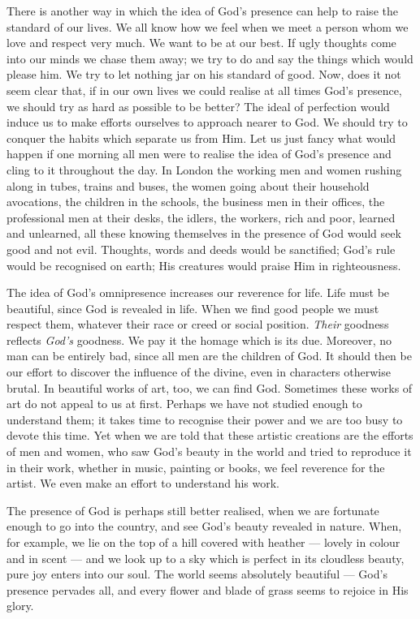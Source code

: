 There is another way in which the idea of
God’s presence can help to raise the standard
of our lives. We all know how we feel
when we meet a person whom we love and
respect very much. We want to be at our
best. If ugly thoughts come into our minds
we chase them away; we try to do and say
the things which would please him. We try
to let nothing jar on his standard of good.
Now, does it not seem clear that, if in our
own lives we could realise at all times God’s
presence, we should try as hard as possible
to be better? The ideal of perfection would
induce us to make efforts ourselves to
approach nearer to God. We should try to
conquer the habits which separate us from
Him. Let us just fancy what would happen
if one morning all men were to realise the
idea of God’s presence and cling to it
throughout the day. In London the working
men and women rushing along in tubes,
trains and buses, the women going about
their household avocations, the children in
the schools, the business men in their offices,
the professional men at their desks, the
idlers, the workers, rich and poor, learned
and unlearned, all these knowing themselves
in the presence of God would seek good and
not evil. Thoughts, words and deeds would
be sanctified; God’s rule would be recognised
on earth; His creatures would praise
Him in righteousness.

The idea of God’s omnipresence increases
our reverence for life. Life must be beautiful,
since God is revealed in life. When
we find good people we must respect them,
whatever their race or creed or social
position. \textsl{Their} goodness reflects \textsl{God's}
goodness. We pay it the homage which is
its due. Moreover, no man can be entirely
bad, since all men are the children of God.
It should then be our effort to discover the
influence of the divine, even in characters
otherwise brutal. In beautiful works of art,
too, we can find God. Sometimes these
works of art do not appeal to us at first.
Perhaps we have not studied enough to
understand them; it takes time to recognise
their power and we are too busy to
devote this time. Yet when we are told
that these artistic creations are the efforts
of men and women, who saw God’s beauty
in the world and tried to reproduce it
in their work, whether in music, painting
or books, we feel reverence for the artist.
We even make an effort to understand his
work.

The presence of God is perhaps still better
realised, when we are fortunate enough to
go into the country, and see God’s beauty
revealed in nature. When, for example, we
lie on the top of a hill covered with heather
— lovely in colour and in scent — and we
look up to a sky which is perfect in its
cloudless beauty, pure joy enters into our
soul. The world seems absolutely beautiful
— God’s presence pervades all, and every
flower and blade of grass seems to rejoice
in His glory.

